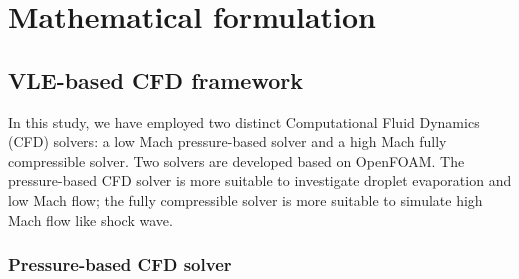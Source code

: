 \chapter{Mathematical formulation}
\label{math_chapter}


\section{VLE-based CFD framework}
\label{sec:model:cfd}


In this study, we have employed two distinct Computational Fluid Dynamics (CFD) solvers: a low Mach pressure-based solver and a high Mach fully compressible solver. Two solvers are developed based on OpenFOAM. The pressure-based CFD solver is more suitable to investigate droplet evaporation and low Mach flow; the fully compressible solver is more suitable to simulate high Mach flow like shock wave.

\subsection{Pressure-based CFD solver}

